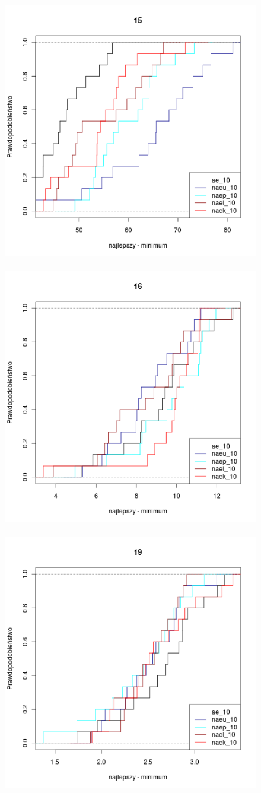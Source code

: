 \documentclass[12pt, a4paper]{article}
\begin{document}
\begin{figure}[H]
\centering
\mbox{
  {\includegraphics[width=.35\textwidth]{../pngs/10/15.png} }
  {\includegraphics[width=.35\textwidth]{../pngs/10/16.png} }
  {\includegraphics[width=.35\textwidth]{../pngs/10/19.png} }}
\end{figure}
\end{document}
